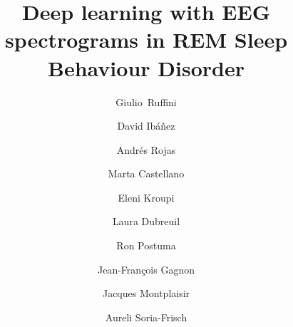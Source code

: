 \documentclass[review]{elsarticle}
\begin{document}
\begin{frontmatter}

\title{Deep learning with EEG spectrograms in REM Sleep Behaviour Disorder}


\author[mymainaddress,mysecondaryaddress]{Giulio~Ruffini}

\author[mysecondaryaddress]{David Ib\'a\~nez }

\author[mysecondaryaddress]{Andr\'es Rojas}

\author[mysecondaryaddress]{Marta Castellano}

\author[mysecondaryaddress]{Eleni Kroupi}

\author[mymainaddress]{Laura Dubreuil}

\author[mythirdaddress]{Ron Postuma}

\author[mythirdaddress]{Jean-Fran\c{c}ois Gagnon}

\author[mythirdaddress]{Jacques Montplaisir}

\author[mysecondaryaddress]{Aureli Soria-Frisch}

\address[mymainaddress]{Neuroelectrics Corporation, Cambridge, MA 02139}
\address[mysecondaryaddress]{Starlab Barcelona, Av. Tibidabo 47 bis, 08035 Barcelona}
\address[mythirdaddress]{Centre for Advanced Research in Sleep Medicine, H\^opital du Sacr\'e-C\oe ur de Montr\'eal, Canada}


\end{frontmatter}
\end{document}

